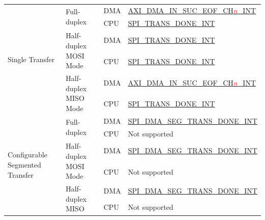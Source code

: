 \documentclass[main\_\_EN.tex]{subfiles}
\begin{document}
\begin{ThreePartTable}
\begin{longtable}[c]{|l|l|l|l|}
\multirow{6}{*}{Single Transfer} & \multirow{2}{*}{Full-duplex} & DMA & \hyperref[int:GDMAINSUCEOFINT]{AXI\_DMA\_IN\_SUC\_EOF\_CH\textcolor{red}{\it{n}}\_INT} \tnote{1} \\ \cline{3-4}
&& CPU & \hyperref[int:SPITRANSDONEINT]{SPI\_TRANS\_DONE\_INT} \tnote{2}  \\ \cline{2-4}
& \multirow{2}{*}{Half-duplex MOSI Mode} & DMA & \hyperref[int:SPITRANSDONEINT]{SPI\_TRANS\_DONE\_INT} \\ \cline{3-4}
&& CPU & \hyperref[int:SPITRANSDONEINT]{SPI\_TRANS\_DONE\_INT}  \\ \cline{2-4}
& \multirow{2}{*}{Half-duplex MISO Mode} & DMA & \hyperref[int:GDMAINSUCEOFINT]{AXI\_DMA\_IN\_SUC\_EOF\_CH\textcolor{red}{\it{n}}\_INT} \\ \cline{3-4}
&& CPU & \hyperref[int:SPITRANSDONEINT]{SPI\_TRANS\_DONE\_INT} \\ \hline
\multirow{6}{*}{Configurable Segmented Transfer} & \multirow{2}{*}{Full-duplex} & DMA & \hyperref[int:SPIDMASEGTRANSDONEINT]{SPI\_DMA\_SEG\_TRANS\_DONE\_INT} \tnote{3} \\ \cline{3-4}
&& CPU & Not supported       \\ \cline{2-4}
& \multirow{2}{*}{Half-duplex MOSI Mode} & DMA  & \hyperref[int:SPIDMASEGTRANSDONEINT]{SPI\_DMA\_SEG\_TRANS\_DONE\_INT} \\ \cline{3-4}
&& CPU           & Not supported       \\ \cline{2-4}
& \multirow{2}{*}{Half-duplex MISO} & DMA & \hyperref[int:SPIDMASEGTRANSDONEINT]{SPI\_DMA\_SEG\_TRANS\_DONE\_INT} \\ \cline{3-4}
&& CPU & Not supported       \\ \hline
\end{longtable}
\end{ThreePartTable}

\clearpage
\end{document}
